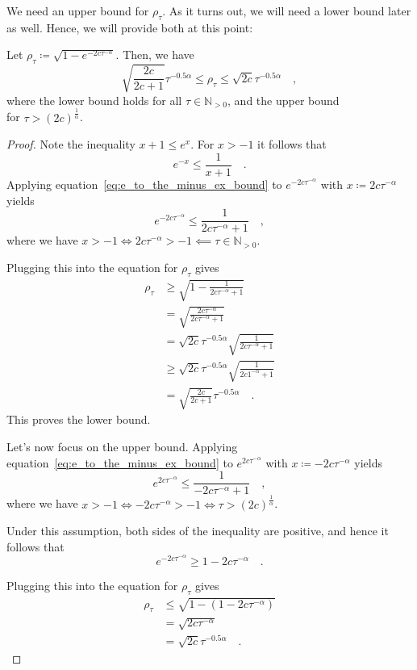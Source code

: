 \documentclass[../../main.tex]{subfiles}
\begin{document}
We need an upper bound for $\rho_\tau$. As it turns out, we will need a lower bound later as well. Hence, we will provide both at this point:

\begin{lemma}
    \label{lemma:bounding_rho}
    Let $\rho_\tau \coloneqq \sqrt{1 - e^{-2c \tau^{-\alpha}}}$. Then, we have
    \[
        \sqrt{\frac{2c}{2c + 1}} \tau^{-0.5 \alpha} \leq \rho_\tau \leq \sqrt{2c} \tau^{-0.5 \alpha} \quad ,
    \]
    where the lower bound holds for all $\tau \in \mathbb{N}_{>0}$, and the upper bound \\ for $\tau > (2c)^{\frac{1}{\alpha}}$.
\end{lemma}

\begin{proof}
    Note the inequality $x + 1 \leq e^x$. For $x > -1$ it follows that
    \begin{equation}
        e^{-x} \leq \frac{1}{x + 1} \label{eq:e_to_the_minus_ex_bound} \quad .
    \end{equation}
    Applying equation~\ref{eq:e_to_the_minus_ex_bound} to $e^{-2c \tau^{-\alpha}}$ with $x \coloneqq 2c \tau^{-\alpha}$ yields
    \[
        e^{-2c \tau^{-\alpha}} \leq \frac{1}{2c \tau^{-\alpha} + 1} \quad ,
    \]
    where we have $x > -1 \iff 2c \tau^{-\alpha} > -1 \impliedby \tau \in \mathbb{N}_{>0}$.

    Plugging this into the equation for $\rho_\tau$ gives
    \begin{align*}
        \rho_\tau &\geq \sqrt{1 - \frac{1}{2c \tau^{-\alpha} + 1}} \\
        &= \sqrt{\frac{2c \tau^{-\alpha}}{2c \tau^{-\alpha} + 1}} \\
        &= \sqrt{2c} \tau^{-0.5\alpha} \sqrt{\frac{1}{2c \tau^{-\alpha} + 1}} \\
        &\geq \sqrt{2c} \tau^{-0.5\alpha} \sqrt{\frac{1}{2c 1^{-\alpha} + 1}} \\
        &= \sqrt{\frac{2c}{2c + 1}} \tau^{-0.5 \alpha} \quad .
    \end{align*}
    This proves the lower bound.

    Let's now focus on the upper bound. Applying equation~\ref{eq:e_to_the_minus_ex_bound} to $e^{2c \tau^{-\alpha}}$ with $x \coloneqq -2c \tau^{-\alpha}$ yields
    \[
        e^{2c \tau^{-\alpha}} \leq \frac{1}{-2c \tau^{-\alpha} + 1} \quad ,
    \]
    where we have $x > -1 \iff -2c \tau^{-\alpha} > -1 \iff \tau > (2c)^{\frac{1}{\alpha}}$.

    Under this assumption, both sides of the inequality are positive, and hence it follows that
    \[
        e^{-2c \tau^{-\alpha}} \geq 1 -2c \tau^{-\alpha} \quad .
    \]

    Plugging this into the equation for $\rho_\tau$ gives
    \begin{align*}
        \rho_\tau &\leq \sqrt{1 - (1 -2c \tau^{-\alpha})} \\
        &= \sqrt{2c \tau^{-\alpha}} \\
        &= \sqrt{2c} \tau^{-0.5\alpha} \quad .
    \end{align*}
\end{proof}
\end{document}
